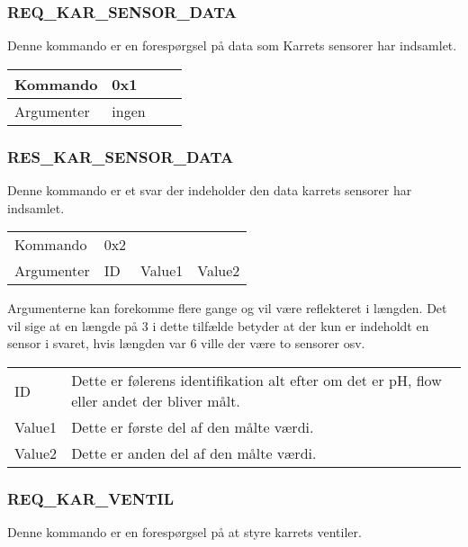 \subsubsection{REQ\_KAR\_SENSOR\_DATA}
Denne kommando er en forespørgsel på data som Karrets sensorer har indsamlet.

\begin{table}[H]
\setlength{\parindent}{12pt}
\begin{tabular}{|l|lcc|}
Kommando & 0x1 & & \\\hline
Argumenter & ingen & & \\
\end{tabular}
\end{table}



\subsubsection{RES\_KAR\_SENSOR\_DATA}
Denne kommando er et svar der indeholder den data karrets sensorer har indsamlet.

\begin{table}[H]
\setlength{\parindent}{12pt}
\begin{tabular}{|l|lcc|}
Kommando & 0x2 & & \\
Argumenter & ID & Value1 & Value2 \\
\end{tabular}
\end{table}

Argumenterne kan forekomme flere gange og vil være reflekteret i længden. Det vil sige at en længde på 3 i dette tilfælde betyder at der kun er indeholdt en sensor i svaret, hvis længden var 6 ville der være to sensorer osv.

\begin{table}[H]
\setlength{\parindent}{12pt}
\begin{tabular}{|l|l|}
ID & Dette er følerens identifikation alt efter om det er pH, flow eller andet der bliver målt. \\
Value1 & Dette er første del af den målte værdi. \\
Value2 & Dette er anden del af den målte værdi.\\
\end{tabular}
\end{table}


\subsubsection{REQ\_KAR\_VENTIL}
Denne kommando er en forespørgsel på at styre karrets ventiler.

